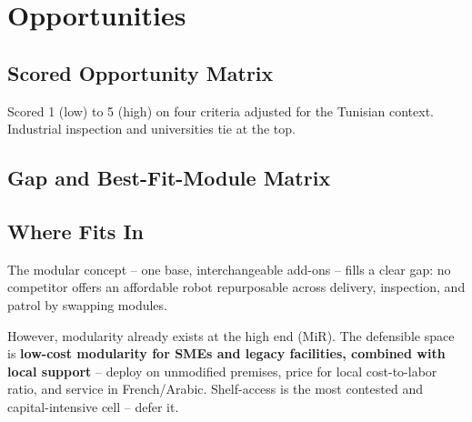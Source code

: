 \chapter{Opportunities}

\section{Scored Opportunity Matrix}

Scored 1 (low) to 5 (high) on four criteria adjusted for the Tunisian context. Industrial inspection and universities tie at the top.



\section{Gap and Best-Fit-Module Matrix}



\section{Where \ProjectName{} Fits In}

The modular concept -- one base, interchangeable add-ons -- fills a clear gap: no competitor offers an affordable robot repurposable across delivery, inspection, and patrol by swapping modules.

However, modularity already exists at the high end (MiR). The defensible space is \textbf{low-cost modularity for SMEs and legacy facilities, combined with local support} -- deploy on unmodified premises, price for local cost-to-labor ratio, and service in French/Arabic. Shelf-access is the most contested and capital-intensive cell -- defer it.